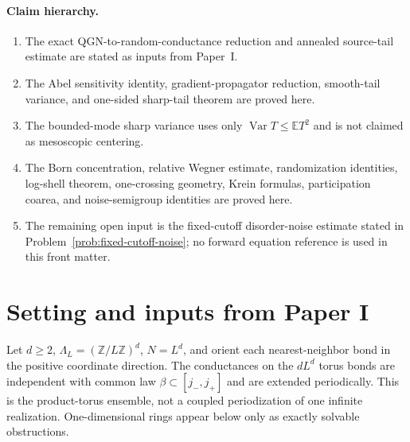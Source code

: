 \documentclass[11pt]{article}
\theoremstyle{definition}
\theoremstyle{remark}
\newcommand{\Z}{\mathbb Z}
\newcommand{\E}{\mathbb E}
\newcommand{\Var}{\operatorname{Var}}
\begin{document}
\paragraph{Claim hierarchy.}
\begin{enumerate}[leftmargin=2.2em,itemsep=0.2em]
 \item The exact QGN-to-random-conductance reduction and annealed source-tail estimate are stated as inputs from Paper~I.
 \item The Abel sensitivity identity, gradient-propagator reduction, smooth-tail variance, and one-sided sharp-tail theorem are proved here.
 \item The bounded-mode sharp variance uses only $\Var T\le\E T^2$ and is not claimed as mesoscopic centering.
 \item The Born concentration, relative Wegner estimate, randomization identities, log-shell theorem, one-crossing geometry, Krein formulas, participation coarea, and noise-semigroup identities are proved here.
 \item The remaining open input is the fixed-cutoff disorder-noise estimate stated in Problem~\ref{prob:fixed-cutoff-noise}; no forward equation reference is used in this front matter.
\end{enumerate}

\section{Setting and inputs from Paper I}
\label{sec:setting}

Let $d\ge2$, $\Lambda_L=(\Z/L\Z)^d$, $N=L^d$, and orient each nearest-neighbor bond in the positive coordinate direction.  The conductances on the $dL^d$ torus bonds are independent with common law $\beta\subset[j_-,j_+]$ and are extended periodically.  This is the product-torus ensemble, not a coupled periodization of one infinite realization.  One-dimensional rings appear below only as exactly solvable obstructions.
\end{document}
